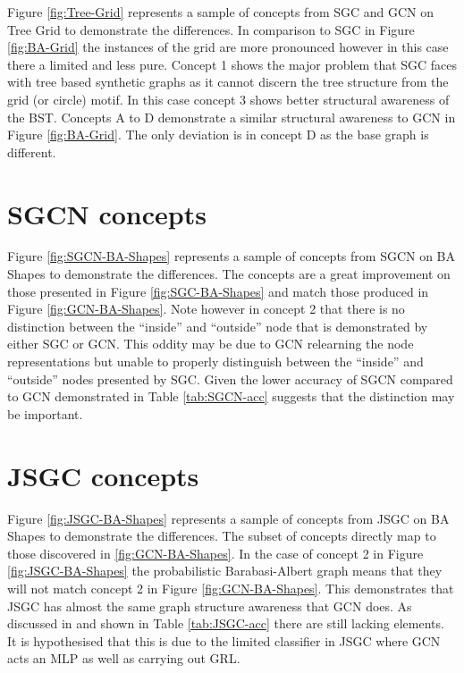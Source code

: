 Figure \ref{fig:Tree-Grid} represents a sample of concepts from SGC and GCN on Tree Grid to demonstrate the differences.
In comparison to SGC in Figure \ref{fig:BA-Grid} the instances of the grid are more pronounced however in this case there a limited and less pure.
Concept 1 shows the major problem that SGC faces with tree based synthetic graphs as it cannot discern the tree structure from the grid (or circle) motif.
In this case concept 3 shows better structural awareness of the BST.
Concepts A to D demonstrate a similar structural awareness to GCN in Figure \ref{fig:BA-Grid}.
The only deviation is in concept D as the base graph is different.

\section{SGCN concepts}


Figure \ref{fig:SGCN-BA-Shapes} represents a sample of concepts from SGCN on BA Shapes to demonstrate the differences.
The concepts are a great improvement on those presented in Figure \ref{fig:SGC-BA-Shapes} and match those produced in Figure \ref{fig:GCN-BA-Shapes}.
Note however in concept 2 that there is no distinction between the ``inside'' and ``outside'' node that is demonstrated by either SGC or GCN.
This oddity may be due to GCN relearning the node representations but unable to properly distinguish between the ``inside'' and ``outside'' nodes presented by SGC.
Given the lower accuracy of SGCN compared to GCN demonstrated in Table \ref{tab:SGCN-acc} suggests that the distinction may be important.

\section{JSGC concepts}


Figure \ref{fig:JSGC-BA-Shapes} represents a sample of concepts from JSGC on BA Shapes to demonstrate the differences.
The subset of concepts directly map to those discovered in \ref{fig:GCN-BA-Shapes}.
In the case of concept 2 in Figure \ref{fig:JSGC-BA-Shapes} the probabilistic Barabasi-Albert graph means that they will not match concept 2 in Figure \ref{fig:GCN-BA-Shapes}.
This demonstrates that JSGC has almost the same graph structure awareness that GCN does.
As discussed in  and shown in Table \ref{tab:JSGC-acc} there are still lacking elements.
It is hypothesised that this is due to the limited classifier in JSGC where GCN acts an MLP as well as carrying out GRL.
